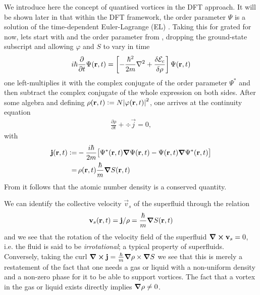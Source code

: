 			We introduce here the concept of quantised vortices in the DFT approach. It will be shown later in  that within the DFT framework, the order parameter $\Psi$ is a solution of the time-dependent Euler-Lagrange (EL) . Taking this for grated for now, lets start with  and the order parameter from , dropping the ground-state subscript and allowing $\varphi$ and $S$ to vary in time
			\begin{align}
				i\hbar\frac{\partial}{\partial t} \Psi({\mathbf r},t) = \left[-\frac{\hbar^2}{2m}\laplacian + \frac{\delta{\cal E}_{c}}{\delta\rho}\right]\Psi(\textbf{r},t)
			\end{align}
			one left-multiplies it with the complex conjugate of the order parameter $\Psi^*$ and then subtract the complex conjugate of the whole expression on both sides. After some algebra and defining $\rho(\bm{\mathrm{r}},t)\vcentcolon=N\abs{\varphi(\bm{\mathrm{r}},t)}^2$, one arrives at the continuity equation
			\begin{align}
				\frac{\partial\rho}{\partial t} + \div{\vec{j}}=0, \label{eq:continuity-eq}
			\end{align}
			with
			\begin{align}
				\bm{\mathrm{j}}(\bm{\mathrm{r}},t) \vcentcolon=& -\frac{i\hbar}{2m}\qty\big[\Psi^*(\bm{\mathrm{r}},t)\grad{\Psi}(\bm{\mathrm{r}},t) - \Psi(\bm{\mathrm{r}},t)\grad{\Psi^*}(\bm{\mathrm{r}},t)] \nonumber \\
					=&\,\rho(\bm{\mathrm{r}},t)\frac{\hbar}{m}\grad{S(\bm{\mathrm{r}},t)}
			\end{align}
			From  it follows that the atomic number density is a conserved quantity.
			
			We can identify the collective velocity $\vec{v}_s$ of the superfluid through the relation
			\begin{align}
				\bm{\mathrm{v}}_s(\bm{\mathrm{r}},t) = \bm{\mathrm{j}}/\rho=\frac{\hbar}{m}\grad{S(\bm{\mathrm{r}},t)} \label{eq:velocity-field}
			\end{align}
			and we see that the rotation of the velocity field of the superfluid $\curl{\bm{\mathrm{v}}_s}=0$, i.e. the fluid is said to be \emph{irrotational}; a typical property of superfluids. Conversely, taking the curl $\curl{\bm{\mathrm{j}}}=\frac{\hbar}{m}\grad{\rho}\times\grad{S}$ we see that this is merely a restatement of the fact that one needs a gas or liquid with a non-uniform density and a non-zero phase for it to be able to support vortices. The fact that a vortex in the gas or liquid exists directly implies $\grad{\rho}\neq 0$.
			
